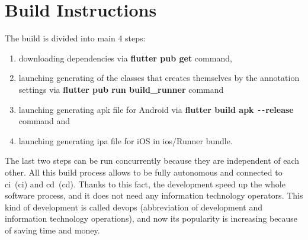 \section{Build Instructions}\label{sec:build-instructions}
The build is divided into main 4 steps:
\begin{enumerate}
    \item downloading dependencies via \textbf{flutter pub get} command,
    \item launching generating of the classes that creates themselves by the annotation settings via \textbf{flutter pub run build\_runner} command
    \item launching generating \acrshort{apk} file for Android via \textbf{flutter build apk \texttt{-{}-}release} command and
    \item launching generating \acrshort{ipa} file for iOS in ios/Runner bundle.
\end{enumerate}
The last two steps can be run concurrently because they are independent of each other.
All this build process allows to be fully autonomous and connected to \acrshort{ci}~(\acrlong{ci}) and \acrshort{cd}~(\acrlong{cd}).
Thanks to this fact, the development speed up the whole software process, and it does not need any information technology operators.
This kind of development is called \acrshort{devops} (abbreviation of development and information technology operations), and now its popularity is increasing because of saving time and money.

